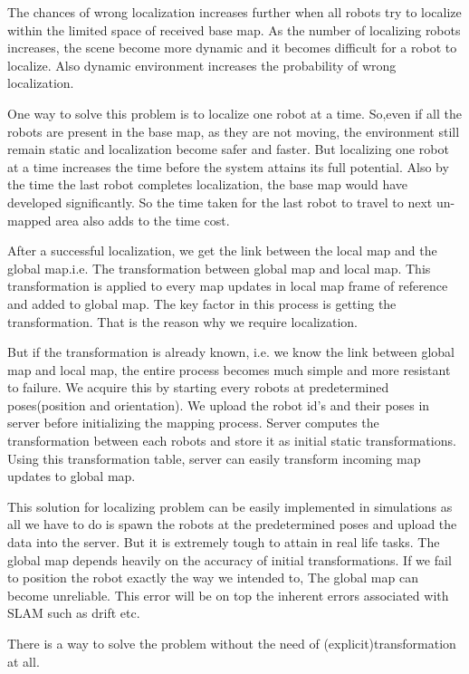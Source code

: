\documentclass[MTech]{iitmdiss}
\begin{document}
The chances of wrong localization increases further when all robots try to localize within the limited space of received base map. As the number of localizing robots increases, the scene become more dynamic and it becomes difficult for a robot to localize. Also dynamic environment increases the probability of wrong localization.\par 
One way to solve this problem is to localize one robot at a time. So,even if all the robots are present in the base map, as they are not moving, the environment still remain static and localization become safer and faster. But localizing one robot at a time increases the time before the system attains its full potential. Also by the time the last robot completes localization, the base map would have developed significantly. So the time taken for the last robot to travel to next un-mapped area also adds to the time cost.

After a successful localization, we get the link between the local map and the global map.i.e. The transformation between global map and local map. This transformation is applied to every map updates in local map frame of reference and added to global map. The key factor in this process is getting the transformation. That is the reason why we require localization.\par
But if the transformation is already known, i.e. we know the link between global map and local map, the entire process becomes much simple and more resistant to failure. We acquire this by starting every robots at predetermined poses(position and orientation). We upload the robot id's and their poses in server before initializing the mapping process. Server computes the transformation between each robots and store it as initial static transformations. Using this transformation table, server can easily transform incoming map updates to global map.\par 
This solution for localizing problem can be easily implemented in simulations as all we have to do is spawn the robots at the predetermined poses and upload the data into the server. But it is extremely tough to attain in real life tasks. The global map depends heavily on the accuracy of initial transformations. If we fail to position the robot exactly the way we intended to, The global map can become unreliable. This error will be on top the inherent errors associated with SLAM such as drift etc.\par
There is a way to solve the problem without the need of (explicit)transformation at all.
\end{document}
